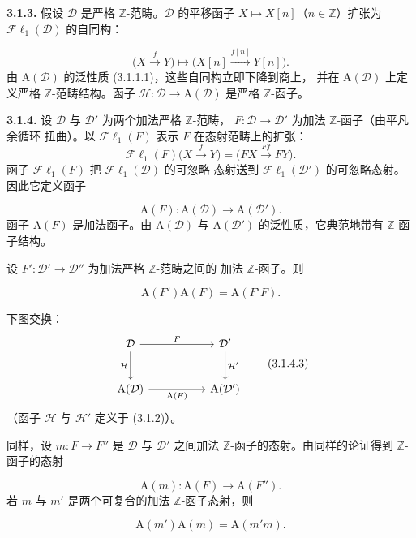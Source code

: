 \clearpage
{}%
\begingroup
\small
\setlength{\parskip}{0pt}%
\setlength{\emergencystretch}{1.5em}%

\noindent\textbf{3.1.3.}\quad
假设 $\mathcal D$ 是严格 $\mathbb Z$-范畴。$\mathcal D$ 的平移函子
$X\longmapsto X[n]$（$n\in\mathbb Z$）扩张为
$\mathcal{F}\ell_1(\mathcal D)$ 的自同构：

\[
\bigl(X\xrightarrow{f}Y\bigr)
\longmapsto
\bigl(X[n]\xrightarrow{f[n]}Y[n]\bigr).
\]
由 $\mathrm A(\mathcal D)$ 的泛性质 (3.1.1.1)，这些自同构立即下降到商上，
并在 $\mathrm A(\mathcal D)$ 上定义严格 $\mathbb Z$-范畴结构。函子
$\mathcal H\colon\mathcal D\to\mathrm A(\mathcal D)$ 是严格
$\mathbb Z$-函子。

\medskip
\noindent\textbf{3.1.4.}\quad
设 $\mathcal D$ 与 $\mathcal D'$ 为两个加法严格 $\mathbb Z$-范畴，
$F\colon\mathcal D\to\mathcal D'$ 为加法 $\mathbb Z$-函子（由平凡余循环
扭曲）。以 $\mathcal{F}\ell_1(F)$ 表示 $F$ 在态射范畴上的扩张：
\[
\mathcal{F}\ell_1(F)\bigl(X\xrightarrow{f}Y\bigr)
=\bigl(FX\xrightarrow{Ff}FY\bigr).
\]
函子 $\mathcal{F}\ell_1(F)$ 把 $\mathcal{F}\ell_1(\mathcal D)$ 的可忽略
态射送到 $\mathcal{F}\ell_1(\mathcal D')$ 的可忽略态射。因此它定义函子

\[
\mathrm A(F)\colon\mathrm A(\mathcal D)\longrightarrow\mathrm A(\mathcal D').
\tag{3.1.4.1}
\]
函子 $\mathrm A(F)$ 是加法函子。由 $\mathrm A(\mathcal D)$ 与
$\mathrm A(\mathcal D')$ 的泛性质，它典范地带有 $\mathbb Z$-函子结构。

设 $F'\colon\mathcal D'\to\mathcal D''$ 为加法严格 $\mathbb Z$-范畴之间的
加法 $\mathbb Z$-函子。则

\[
\mathrm A(F')\mathrm A(F)=\mathrm A(F'F).
\tag{3.1.4.2}
\]

下图交换：
\[
\begin{tikzcd}[column sep=5em,row sep=2.5em]
\mathcal D \arrow[r,"F"] \arrow[d,"\mathcal H"'] &
\mathcal D' \arrow[d,"\mathcal H'"] \\
\mathrm A(\mathcal D) \arrow[r,"\mathrm A(F)"'] &
\mathrm A(\mathcal D')
\end{tikzcd}
\tag{3.1.4.3}
\]
（函子 $\mathcal H$ 与 $\mathcal H'$ 定义于 (3.1.2)）。

同样，设 $m\colon F\to F''$ 是 $\mathcal D$ 与 $\mathcal D'$ 之间加法
$\mathbb Z$-函子的态射。由同样的论证得到 $\mathbb Z$-函子的态射

\[
\mathrm A(m)\colon\mathrm A(F)\longrightarrow\mathrm A(F'').
\tag{3.1.4.4}
\]
若 $m$ 与 $m'$ 是两个可复合的加法 $\mathbb Z$-函子态射，则

\[
\mathrm A(m')\mathrm A(m)=\mathrm A(m'm).
\tag{3.1.4.5}
\]
\endgroup
